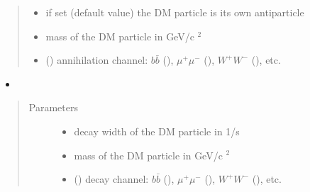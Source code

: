 \documentclass[letterpaper,10pt,english]{sphinxmanual}
\begin{document}
\begin{fulllineitems}
\begin{quote}
\begin{description}
\begin{itemize}
\item {} 
\sphinxAtStartPar
{} \textendash{} if set  (default value) the DM particle is its own antiparticle

\item {} 
\sphinxAtStartPar
{} \textendash{} mass of the DM particle in GeV/c \({}^2\)

\item {} 
\sphinxAtStartPar
{} () \textendash{} annihilation channel: \(b\bar b\) (), \(\mu^+ \mu^-\) (), \(W^+ W^-\) (), etc.

\end{itemize}

\end{description}\end{quote}
\begin{itemize}
\item {} 
\sphinxAtStartPar
{}

\end{itemize}
\begin{quote}\begin{description}
\item[{Parameters}] \leavevmode\begin{itemize}
\item {} 
\sphinxAtStartPar
{} \textendash{} decay width of the DM particle in 1/s

\item {} 
\sphinxAtStartPar
{} \textendash{} mass of the DM particle in GeV/c \({}^2\)

\item {} 
\sphinxAtStartPar
{} () \textendash{} decay channel: \(b\bar b\) (), \(\mu^+ \mu^-\) (), \(W^+ W^-\) (), etc.


\end{itemize}
\end{description}
\end{quote}
\end{fulllineitems}
\end{document}
